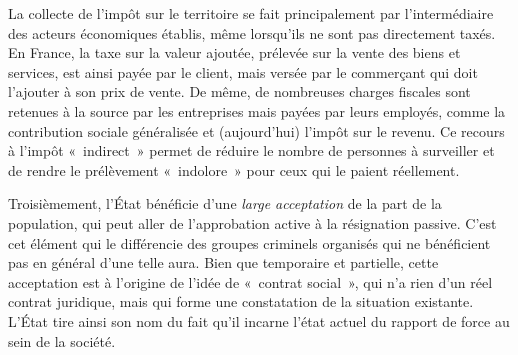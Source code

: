 La collecte de l'impôt sur le territoire se fait principalement par l'intermédiaire des acteurs économiques établis, même lorsqu'ils ne sont pas directement taxés. En France, la taxe sur la valeur ajoutée, prélevée sur la vente des biens et services, est ainsi payée par le client, mais versée par le commerçant qui doit l'ajouter à son prix de vente. De même, de nombreuses charges fiscales sont retenues à la source par les entreprises mais payées par leurs employés, comme la contribution sociale généralisée et (aujourd'hui) l'impôt sur le revenu. Ce recours à l'impôt «~indirect~» permet de réduire le nombre de personnes à surveiller et de rendre le prélèvement «~indolore~» pour ceux qui le paient réellement. %

Troisièmement, l'État bénéficie d'une \emph{large acceptation} de la part de la population, qui peut aller de l'approbation active à la résignation passive. C'est cet élément qui le différencie des groupes criminels organisés qui ne bénéficient pas en général d'une telle aura. Bien que temporaire et partielle, cette acceptation est à l'origine de l'idée de «~contrat social~», qui n'a rien d'un réel contrat juridique, mais qui forme une constatation de la situation existante. L'État tire ainsi son nom du fait qu'il incarne l'état actuel du rapport de force au sein de la société.

